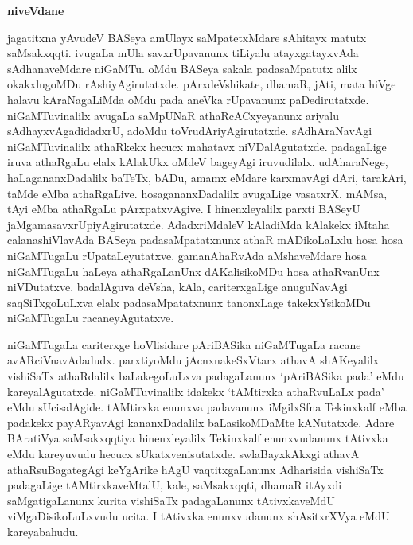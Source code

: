\begin{center}
{\Huge\bfseries niveVdane}
\end{center}

\bigskip

jagatitxna yAvudeV BASeya amUlayx saMpatetxMdare sAhitayx matutx saMsakxqqti. ivugaLa mUla savxrUpavanunx tiLiyalu atayxgatayxvAda sAdhanaveMdare niGaMTu. oMdu BASeya sakala padasaMpatutx alilx okakxlugoMDu rAshiyAgirutatxde. pArxdeVshikate, dhamaR, jAti, mata hiVge halavu kAraNagaLiMda oMdu pada aneVka rUpavanunx paDedirutatxde. niGaMTuvinalilx avugaLa saMpUNaR athaRcACxyeyanunx ariyalu sAdhayxvAgadidadxrU, adoMdu toVrudAriyAgirutatxde. sAdhAraNavAgi niGaMTuvinalilx athaRkekx hecucx mahatavx niVDalAgutatxde. padagaLige iruva athaRgaLu elalx kAlakUkx oMdeV bageyAgi iruvudilalx. udAharaNege, haLagananxDadalilx baTeTx, bADu, amamx eMdare karxmavAgi dAri, tarakAri, taMde eMba athaRgaLive. hosagananxDadalilx avugaLige vasatxrX, mAMsa, tAyi eMba athaRgaLu pArxpatxvAgive. I hinenxleyalilx parxti BASeyU jaMgamasavxrUpiyAgirutatxde. AdadxriMdaleV kAladiMda kAlakekx iMtaha calanashiVlavAda BASeya padasaMpatatxnunx athaR mADikoLaLxlu hosa hosa niGaMTugaLu rUpataLeyutatxve. gamanAhaRvAda aMshaveMdare hosa niGaMTugaLu haLeya athaRgaLanUnx dAKalisikoMDu hosa athaRvanUnx niVDutatxve. badalAguva deVsha, kAla, cariterxgaLige anuguNavAgi saqSiTxgoLuLxva elalx padasaMpatatxnunx tanonxLage takekxYsikoMDu niGaMTugaLu racaneyAgutatxve.

\smallskip

niGaMTugaLa cariterxge hoVlisidare pAriBASika niGaMTugaLa racane avARciVnavAdadudx. parxtiyoMdu jAcnxnakeSxVtarx athavA shAKeyalilx vishiSaTx athaRdalilx baLakegoLuLxva padagaLanunx `pAriBASika pada'  eMdu kareyalAgutatxde. niGaMTuvinalilx idakekx `tAMtirxka athaRvuLaLx pada' eMdu sUcisalAgide. tAMtirxka enunxva padavanunx iMgilxSfna Tekinxkalf eMba padakekx payARyavAgi kananxDadalilx baLasikoMDaMte kANutatxde. Adare BAratiVya saMsakxqqtiya hinenxleyalilx Tekinxkalf enunxvudanunx tAtivxka eMdu kareyuvudu hecucx sUkatxvenisutatxde.  swlaBayxkAkxgi  athavA athaRsuBagategAgi  keYgArike hAgU vaqtitxgaLanunx Adharisida vishiSaTx padagaLige  tAMtirxkaveMtalU, kale, saMsakxqqti, dhamaR itAyxdi saMgatigaLanunx kurita vishiSaTx padagaLanunx tAtivxkaveMdU viMgaDisikoLuLxvudu ucita. I tAtivxka enunxvudanunx shAsitxrXVya eMdU  kareyabahudu. 

